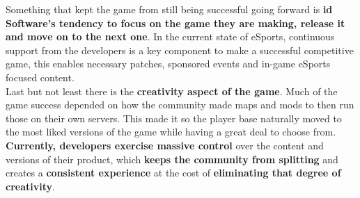 Something that kept the game from still being successful going forward is \textbf{id Software's tendency to focus on the game they are making, release it and move on to the next one}. In the current state of eSports, continuous support from the developers is a key component to make a successful competitive game, this enables necessary patches, sponsored events and in-game eSports focused content.\\

Last but not least there is the \textbf{creativity aspect of the game}. Much of the game success depended on how the community made maps and mods to then run those on their own servers. This made it so the player base naturally moved to the most liked versions of the game while having a great deal to choose from. \textbf{Currently, developers exercise massive control} over the content and versions of their product, which\textbf{ keeps the community from splitting} and creates a \textbf{consistent experience} at the cost of \textbf{eliminating that degree of creativity}.
